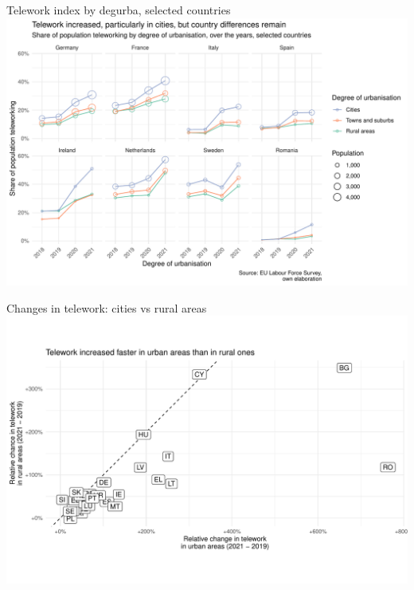 \documentclass[10pt]{beamer}
\begin{document}
\begin{frame}{Telework index by degurba, selected countries}
\pause
\centering
\includegraphics[width=\textwidth,height=0.9\textheight,keepaspectratio]{Telework_degurba_selected.pdf}
\end{frame}

\begin{frame}{Changes in telework: cities vs rural areas}
\pause
\centering
\includegraphics[width=\textwidth,height=0.9\textheight,keepaspectratio]{Telework_changes_degurba.pdf}
\end{frame}
\end{document}
